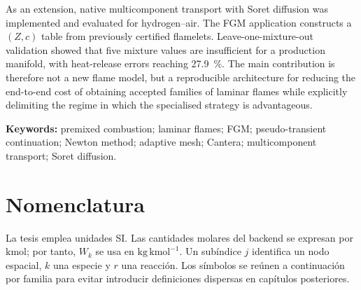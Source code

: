 \documentclass[12pt,a4paper,twoside,openany]{book}
\begin{document}
As an extension, native multicomponent transport with Soret diffusion was
implemented and evaluated for hydrogen--air. The FGM application constructs a
\((Z,c)\) table from previously certified flamelets. Leave-one-mixture-out
validation showed that five mixture values are insufficient for a production
manifold, with heat-release errors reaching \SI{27.9}{\percent}. The main
contribution is therefore not a new flame model, but a reproducible architecture
for reducing the end-to-end cost of obtaining accepted families of laminar
flames while explicitly delimiting the regime in which the specialised strategy
is advantageous.

\textbf{Keywords:} premixed combustion; laminar flames; FGM; pseudo-transient
continuation; Newton method; adaptive mesh; Cantera; multicomponent transport;
Soret diffusion.

\cleardoublepage
\tableofcontents
\cleardoublepage
\listoffigures
\cleardoublepage
\listoftables

\cleardoublepage
\chapter*{Nomenclatura}
La tesis emplea unidades SI. Las cantidades molares del backend se expresan por
\(\mathrm{kmol}\); por tanto, \(W_k\) se usa en \(\mathrm{kg\,kmol^{-1}}\).
Un subíndice \(j\) identifica un nodo espacial, \(k\) una especie y \(r\) una
reacción. Los símbolos se reúnen a continuación por familia para evitar
introducir definiciones dispersas en capítulos posteriores.
\end{document}
